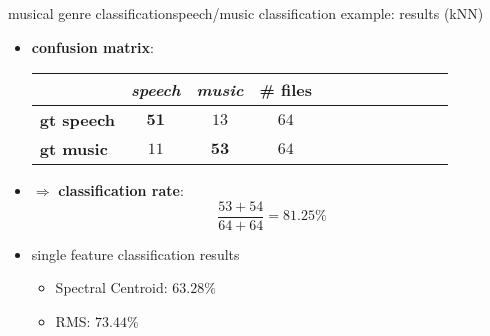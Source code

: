         \begin{frame}{musical genre classification}{speech/music classification example: results (kNN)}
            \begin{itemize}
                \item   \textbf{confusion matrix}:
                    \begin{table}
                        \centering
                        \begin{tabular}{l|cc|ccccccccc} %
                            \bf{\emph{}}	 & \bf{\emph{speech}}	 & \bf{\emph{music}} & \# files	 \\ 
                             \hline
                            \bf{gt speech}	 & $\mathbf{51}$	 & $13$	 & $64$\\
                            \bf{gt music}	 & $11$	 & $\mathbf{53}$ & $64$
                        \end{tabular}
                    \end{table}
                \item<2->$\Rightarrow$ \textbf{classification rate}: 
                    \begin{equation*}
                        \frac{53 + 54}{64 + 64} = 81.25\%
                    \end{equation*}
                \smallskip
                \item<3->   single feature classification results
                    \begin{itemize}
                        \item	Spectral Centroid: $63.28\%$
                        \item	RMS: $73.44\%$
                    \end{itemize}
            \end{itemize}
                        
        \end{frame}
    
